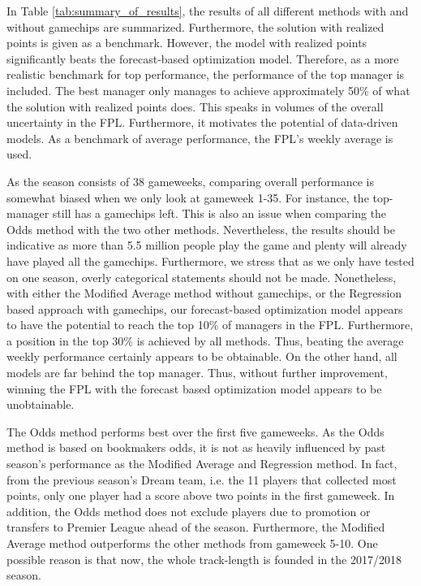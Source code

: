 In Table \ref{tab:summary_of_results}, the results of all different methods with and without gamechips are summarized. Furthermore, the solution with realized points is given as a benchmark. However, the model with realized points significantly beats the forecast-based optimization model. Therefore, as a more realistic benchmark for top performance, the performance of the top manager is included. The best manager only manages to achieve approximately 50\% of what the solution with realized points does. This speaks in volumes of the overall uncertainty in the FPL. Furthermore, it motivates the potential of data-driven models. As a benchmark of average performance, the FPL's weekly average is used.

\newpar

As the season consists of 38 gameweeks, comparing overall performance is somewhat biased when we only look at gameweek 1-35. For instance, the top-manager still has a gamechips left. This is also an issue when comparing the Odds method with the two other methods. Nevertheless, the results should be indicative as more than 5.5 million people play the game and plenty will already have played all the gamechips. Furthermore, we stress that as we only have tested on one season, overly categorical statements should not be made. Nonetheless, with either the Modified Average method without gamechips, or the Regression based approach with gamechips, our forecast-based optimization model appears to have the potential to reach the top 10\% of managers in the FPL. Furthermore, a position in the top 30\% is achieved by all methods. Thus, beating the average weekly performance certainly appears to be obtainable. On the other hand, all models are far behind the top manager. Thus, without further improvement, winning the FPL with the forecast based optimization model appears to be unobtainable. 

\newpar

The Odds method performs best over the first five gameweeks. As the Odds method is based on bookmakers odds, it is not as heavily influenced by past season's performance as the Modified Average and Regression method. In fact, from the previous season's Dream team, i.e. the 11 players that collected most points, only one player had a score above two points in the first gameweek. In addition, the Odds method does not exclude players due to promotion or transfers to Premier League ahead of the season. Furthermore, the Modified Average method outperforms the other methods from gameweek 5-10. One possible reason is that now, the whole track-length is founded in the 2017/2018 season.

